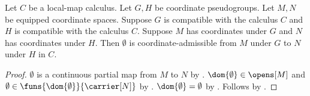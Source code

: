 \begin{theorem}\label{empty_coordinate_admissible_map}
    Let $C$ be a local-map calculus.
    Let $G,H$ be coordinate pseudogroups.
    Let $M,N$ be equipped coordinate spaces.
    Suppose $G$ is compatible with the calculus $C$ and $H$ is compatible with the calculus $C$.
    Suppose $M$ has coordinates under $G$ and $N$ has coordinates under $H$.
    Then $\emptyset$ is coordinate-admissible from $M$ under $G$ to $N$ under $H$ in $C$.
\end{theorem}
\begin{proof}
    $\emptyset$ is a continuous partial map from $M$ to $N$ by .
    $\dom{\emptyset}\in\opens[M]$ and $\emptyset\in\funs{\dom{\emptyset}}{\carrier[N]}$ by
        .
    $\dom{\emptyset}=\emptyset$ by .
    Follows by .
\end{proof}
